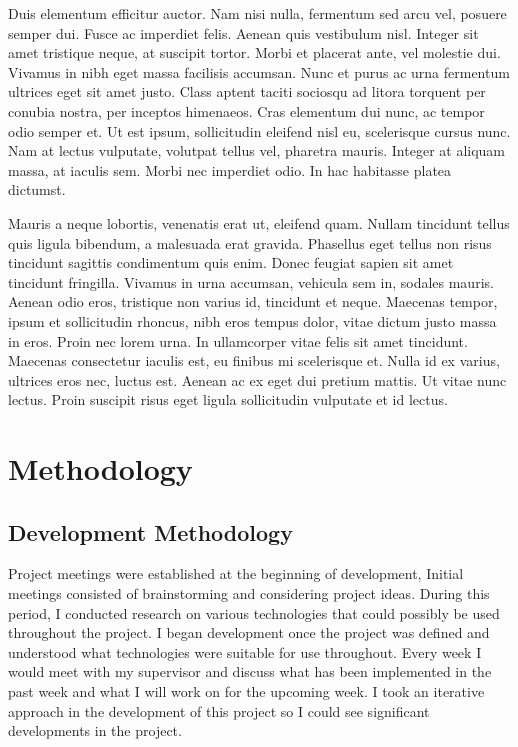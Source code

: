 Duis elementum efficitur auctor. Nam nisi nulla, fermentum sed arcu vel, posuere semper dui. Fusce ac imperdiet felis. Aenean quis vestibulum nisl. Integer sit amet tristique neque, at suscipit tortor. Morbi et placerat ante, vel molestie dui. Vivamus in nibh eget massa facilisis accumsan. Nunc et purus ac urna fermentum ultrices eget sit amet justo. Class aptent taciti sociosqu ad litora torquent per conubia nostra, per inceptos himenaeos. Cras elementum dui nunc, ac tempor odio semper et. Ut est ipsum, sollicitudin eleifend nisl eu, scelerisque cursus nunc. Nam at lectus vulputate, volutpat tellus vel, pharetra mauris. Integer at aliquam massa, at iaculis sem. Morbi nec imperdiet odio. In hac habitasse platea dictumst.

Mauris a neque lobortis, venenatis erat ut, eleifend quam. Nullam tincidunt tellus quis ligula bibendum, a malesuada erat gravida. Phasellus eget tellus non risus tincidunt sagittis condimentum quis enim. Donec feugiat sapien sit amet tincidunt fringilla. Vivamus in urna accumsan, vehicula sem in, sodales mauris. Aenean odio eros, tristique non varius id, tincidunt et neque. Maecenas tempor, ipsum et sollicitudin rhoncus, nibh eros tempus dolor, vitae dictum justo massa in eros. Proin nec lorem urna. In ullamcorper vitae felis sit amet tincidunt. Maecenas consectetur iaculis est, eu finibus mi scelerisque et. Nulla id ex varius, ultrices eros nec, luctus est. Aenean ac ex eget dui pretium mattis. Ut vitae nunc lectus. Proin suscipit risus eget ligula sollicitudin vulputate et id lectus.


\chapter{Methodology}
\section{Development Methodology}
Project meetings were established at the beginning of development, Initial meetings consisted of brainstorming and considering project ideas. During this period, I conducted research on various technologies that could possibly be used throughout the project. I began development once the project was defined and understood what technologies were suitable for use throughout. Every week I would meet with my supervisor and discuss what has been implemented in the past week and what I will work on for the upcoming week. I took an iterative approach in the development of this project so I could see significant developments in the project.
